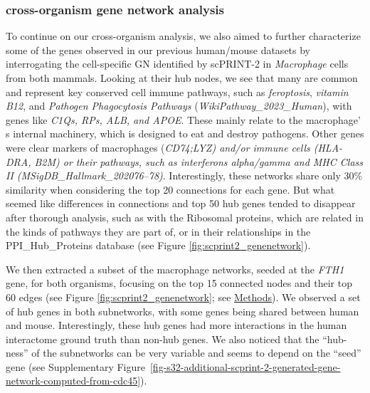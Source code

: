 \subsubsection{cross-organism gene network
analysis}\label{cross-organism-gene-network-analysis}

To continue on our cross-organism analysis, we also aimed to further
characterize some of the genes observed in our previous human/mouse
datasets by interrogating the cell-specific GN identified by \gls{scPRINT}-2
in \emph{Macrophage} cells from both mammals. Looking at their hub
nodes, we see that many are common and represent key conserved cell
immune pathways, such as \emph{feroptosis}, \emph{vitamin B12}, and
\emph{Pathogen Phagocytosis Pathways} (\emph{WikiPathway\_2023\_Human}),
with genes like \emph{C1Qs, RPs, ALB, and APOE}\citep{mesquitaHFerritinEssentialMacrophages2020,bockAhReceptorVitamin2024}.
These mainly relate to the macrophage' s internal
machinery, which is designed to eat and destroy pathogens. Other genes
were clear markers of macrophages (\emph{CD74;LYZ) and/or immune cells
(HLA-DRA, B2M) or their pathways, such as interferons alpha/gamma and
MHC Class II (MSigDB\_Hallmark\_202076--78)}. Interestingly, these
networks share only 30\% similarity when considering the top 20
connections for each gene. But what seemed like differences in
connections and top 50 hub genes tended to disappear after thorough
analysis, such as with the Ribosomal proteins, which are related in the
kinds of pathways they are part of, or in their relationships in the
PPI\_Hub\_Proteins database\citep{fangGSEApyComprehensivePackage2023} (see Figure \ref{fig:scprint2_genenetwork}).

We then extracted a subset of the macrophage networks, seeded at the
\emph{FTH1} gene, for both organisms, focusing on the top 15 connected
nodes and their top 60 edges (see Figure \ref{fig:scprint2_genenetwork}; see
\hyperref[plotting-gene-sub-networks]{Methods}). We observed a set
of hub genes in both subnetworks, with some genes being shared between
human and mouse. Interestingly, these hub genes had more interactions in
the human interactome ground truth than non-hub genes. We also noticed
that the ``hub-ness'' of the subnetworks can be very variable and seems
to depend on the ``seed'' gene (see Supplementary Figure~\ref{fig-s32-additional-scprint-2-generated-gene-network-computed-from-cdc45}).

